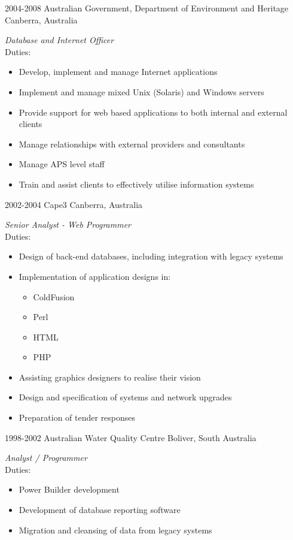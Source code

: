 \documentclass{resume} %
\begin{document}
\begin{entrylist}
\entry
{2004-2008}
{Australian Government, Department of Environment and Heritage}
{Canberra, Australia}
{\emph{Database and Internet Officer} \\
Duties:
\begin{itemize}
\item Develop, implement and manage Internet applications
\item Implement and manage mixed Unix (Solaris) and Windows servers
\item Provide support for web based applications to both internal and external clients
\item Manage relationships with external providers and consultants
\item Manage APS level staff
\item Train and assist clients to effectively utilise information systems
\end{itemize}}
\entry
{2002-2004}
{Cape3}
{Canberra, Australia}
{\emph{Senior Analyst - Web Programmer} \\
Duties:
\begin{itemize}
\item Design of back-end databases, including integration with legacy systems
\item Implementation of application designs in:
\begin{itemize}
\item ColdFusion
\item Perl
\item HTML
\item PHP
\end{itemize}
\item Assisting graphics designers to realise their vision
\item Design and specification of systems and network upgrades
\item Preparation of tender responses
\end{itemize}}
\entry
{1998-2002}
{Australian Water Quality Centre}
{Boliver, South Australia}
{\emph{Analyst / Programmer} \\
Duties:
\begin{itemize}
\item Power Builder development
\item Development of database reporting software
\item Migration and cleansing of data from legacy systems

\end{itemize}}
\end{entrylist}
\end{document}
